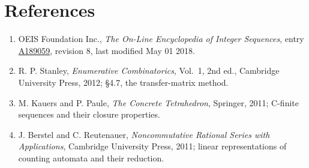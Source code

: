\documentclass[11pt]{article}
\theoremstyle{definition}
\begin{document}
\section{References}

\begin{enumerate}

\item OEIS Foundation Inc., \emph{The On-Line Encyclopedia of Integer Sequences}, entry \href{https://oeis.org/A189059}{A189059}, revision 8, last modified May 01 2018.

\item R. P. Stanley, \emph{Enumerative Combinatorics}, Vol.~1, 2nd ed., Cambridge University Press, 2012; \S4.7, the transfer-matrix method.

\item M. Kauers and P. Paule, \emph{The Concrete Tetrahedron}, Springer, 2011; C-finite sequences and their closure properties.

\item J. Berstel and C. Reutenauer, \emph{Noncommutative Rational Series with Applications}, Cambridge University Press, 2011; linear representations of counting automata and their reduction.

\end{enumerate}
\end{document}
